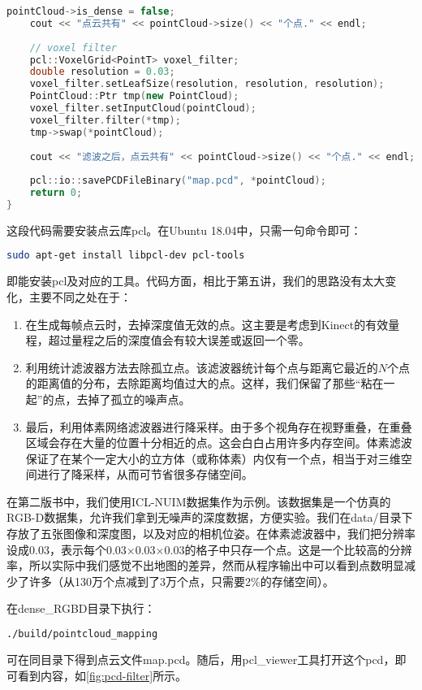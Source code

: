 \begin{lstlisting}[language=c++,caption=slambook/ch12/dense\_RGBD/pointcloud\_mapping.cpp（片段）]
    pointCloud->is_dense = false;
    cout << "点云共有" << pointCloud->size() << "个点." << endl;
    
    // voxel filter 
    pcl::VoxelGrid<PointT> voxel_filter;
    double resolution = 0.03;
    voxel_filter.setLeafSize(resolution, resolution, resolution);       // resolution
    PointCloud::Ptr tmp(new PointCloud);
    voxel_filter.setInputCloud(pointCloud);
    voxel_filter.filter(*tmp);
    tmp->swap(*pointCloud);
    
    cout << "滤波之后，点云共有" << pointCloud->size() << "个点." << endl;
    
    pcl::io::savePCDFileBinary("map.pcd", *pointCloud);
    return 0;
}
\end{lstlisting}

这段代码需要安装点云库pcl。在Ubuntu 18.04中，只需一句命令即可：
\begin{lstlisting}[language=sh, caption=终端输入：]
sudo apt-get install libpcl-dev pcl-tools
\end{lstlisting}
即能安装pcl及对应的工具。代码方面，相比于第五讲，我们的思路没有太大变化，主要不同之处在于：

\begin{enumerate}
	\item 在生成每帧点云时，去掉深度值无效的点。这主要是考虑到Kinect的有效量程，超过量程之后的深度值会有较大误差或返回一个零。
	\item 利用统计滤波器方法去除孤立点。该滤波器统计每个点与距离它最近的$N$个点的距离值的分布，去除距离均值过大的点。这样，我们保留了那些“粘在一起”的点，去掉了孤立的噪声点。
	\item 最后，利用体素网络滤波器进行降采样。由于多个视角存在视野重叠，在重叠区域会存在大量的位置十分相近的点。这会白白占用许多内存空间。体素滤波保证了在某个一定大小的立方体（或称体素）内仅有一个点，相当于对三维空间进行了降采样，从而可节省很多存储空间。
\end{enumerate}

在第二版书中，我们使用ICL-NUIM数据集作为示例。该数据集是一个仿真的RGB-D数据集，允许我们拿到无噪声的深度数据，方便实验。我们在data/目录下存放了五张图像和深度图，以及对应的相机位姿。在体素滤波器中，我们把分辨率设成0.03，表示每个0.03$\times$0.03$\times$0.03的格子中只存一个点。这是一个比较高的分辨率，所以实际中我们感觉不出地图的差异，然而从程序输出中可以看到点数明显减少了许多（从130万个点减到了3万个点，只需要2$\%$的存储空间）。

在dense\_RGBD目录下执行：
\begin{lstlisting}[language=sh, caption=终端输入：]
./build/pointcloud_mapping
\end{lstlisting}
可在同目录下得到点云文件map.pcd。随后，用pcl\_viewer工具打开这个pcd，即可看到内容，如\autoref{fig:pcd-filter}所示。


